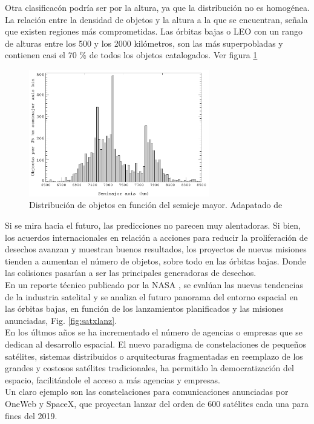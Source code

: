 Otra clasificac\'on podr\'ia ser por la altura, ya que la distribuci\'on no es homog\'enea. La relaci\'on entre la densidad de objetos y la altura a la que se encuentran, señala que existen regiones m\'as comprometidas.
Las \'orbitas bajas o \ac{LEO} con un rango de alturas entre los 500 y los 2000 kil\'ometros, son las m\'as superpobladas y contienen casi el 70 \% de todos los objetos catalogados. Ver figura \ref{fig:Dvsaltura}

\begin{figure}[!h]
  \centering
  \includegraphics[width=0.7\textwidth]{imagenes/SDvsaltura2011}
  \caption[Distribuci\'on de objetos en funci\'on del semieje mayor.]{Distribuci\'on de objetos en funci\'on del semieje mayor. Adapatado de \citep{Klinkrad}}
  \label{fig:Dvsaltura}
\end{figure}

Si se mira hacia el futuro, las predicciones no parecen muy alentadoras. Si bien, los acuerdos internacionales en relaci\'on a acciones para reducir la proliferaci\'on de desechos avanzan y muestran buenos resultados, los proyectos de nuevas misiones tienden a aumentan el n\'umero de objetos, sobre todo en las \'orbitas bajas. Donde las colisiones pasar\'ian a ser las principales generadoras de desechos.\\

En un reporte t\'ecnico publicado por la NASA \citep{karacalioglu2016impact}, se eval\'uan las nuevas tendencias de la industria satelital y se analiza el futuro panorama del entorno espacial en las \'orbitas bajas, en funci\'on de los lanzamientos planificados y las misiones anunciadas, Fig. \ref{fig:satxlanz}.\\

En los \'ultmos a\~nos se ha incrementado el n\'umero de agencias o empresas que se dedican al desarrollo espacial. El nuevo paradigma de constelaciones de peque\~nos sat\'elites, sistemas distribuidos o arquitecturas fragmentadas en reemplazo de los grandes y costosos sat\'elites tradicionales, ha permitido la democratizaci\'on del espacio, facilit\'andole el acceso a m\'as agencias y empresas.\\ 
Un claro ejemplo son las constelaciones para comunicaciones anunciadas por OneWeb y SpaceX, que proyectan lanzar del orden de 600 sat\'elites cada una para fines del 2019.\\

